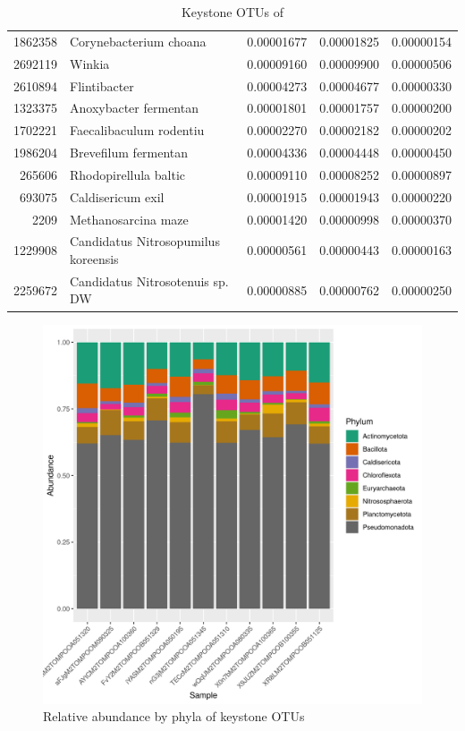 \begin{table}[ht]
\begin{tabular}{rlrrr}
  1862358 & Corynebacterium choana & 0.00001677 & 0.00001825 & 0.00000154 \\ 
  2692119 & Winkia & 0.00009160 & 0.00009900 & 0.00000506 \\ 
  2610894 & Flintibacter & 0.00004273 & 0.00004677 & 0.00000330 \\ 
  1323375 & Anoxybacter fermentan & 0.00001801 & 0.00001757 & 0.00000200 \\ 
  1702221 & Faecalibaculum rodentiu & 0.00002270 & 0.00002182 & 0.00000202 \\ 
  1986204 & Brevefilum fermentan & 0.00004336 & 0.00004448 & 0.00000450 \\ 
  265606 & Rhodopirellula baltic & 0.00009110 & 0.00008252 & 0.00000897 \\ 
  693075 & Caldisericum exil & 0.00001915 & 0.00001943 & 0.00000220 \\ 
  2209 & Methanosarcina maze & 0.00001420 & 0.00000998 & 0.00000370 \\ 
  1229908 & Candidatus Nitrosopumilus koreensis & 0.00000561 & 0.00000443 & 0.00000163 \\ 
  2259672 & Candidatus Nitrosotenuis sp. DW & 0.00000885 & 0.00000762 & 0.00000250 \\ 
   \hline
\end{tabular}
\caption{Keystone OTUs of } 
\end{table}
\begin{figure}
\centering
\includegraphics[scale = 0.8]{tomate_aleatorio1_6.csv_relative_abundance_Phylum.png}
\caption{Relative abundance by phyla of keystone OTUs }
\label{fig:tomate_aleatorio1_6.csv_phyla}
\end{figure}
